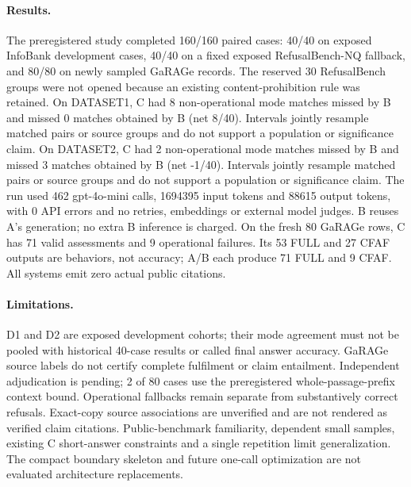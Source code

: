 \paragraph{Results.}
The preregistered study completed 160/160 paired cases: 40/40 on exposed InfoBank development cases, 40/40 on a fixed exposed RefusalBench-NQ fallback, and 80/80 on newly sampled GaRAGe records. The reserved 30 RefusalBench groups were not opened because an existing content-prohibition rule was retained.
On DATASET1, C had 8 non-operational mode matches missed by B and missed 0 matches obtained by B (net 8/40). Intervals jointly resample matched pairs or source groups and do not support a population or significance claim.
On DATASET2, C had 2 non-operational mode matches missed by B and missed 3 matches obtained by B (net -1/40). Intervals jointly resample matched pairs or source groups and do not support a population or significance claim.
The run used 462 gpt-4o-mini calls, 1694395 input tokens and 88615 output tokens, with 0 API errors and no retries, embeddings or external model judges. B reuses A's generation; no extra B inference is charged.
On the fresh 80 GaRAGe rows, C has 71 valid assessments and 9 operational failures. Its 53 FULL and 27 CFAF outputs are behaviors, not accuracy; A/B each produce 71 FULL and 9 CFAF. All systems emit zero actual public citations.

\paragraph{Limitations.}
D1 and D2 are exposed development cohorts; their mode agreement must not be pooled with historical 40-case results or called final answer accuracy. GaRAGe source labels do not certify complete fulfilment or claim entailment. Independent adjudication is pending; 2 of 80 cases use the preregistered whole-passage-prefix context bound. Operational fallbacks remain separate from substantively correct refusals. Exact-copy source associations are unverified and are not rendered as verified claim citations. Public-benchmark familiarity, dependent small samples, existing C short-answer constraints and a single repetition limit generalization. The compact boundary skeleton and future one-call optimization are not evaluated architecture replacements.
